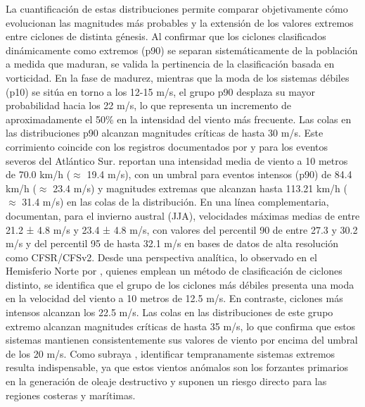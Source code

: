 La cuantificación de estas distribuciones permite comparar objetivamente cómo evolucionan las magnitudes más probables y la extensión de los valores extremos entre ciclones de distinta génesis. Al confirmar que los ciclones clasificados dinámicamente como extremos (p90) se separan sistemáticamente de la población a medida que maduran, se valida la pertinencia de la clasificación basada en vorticidad. En la fase de madurez, mientras que la moda de los sistemas débiles (p10) se sitúa en torno a los 12-15 m/s, el grupo p90 desplaza su mayor probabilidad hacia los 22 m/s, lo que representa un incremento de aproximadamente el 50\% en la intensidad del viento más frecuente. Las colas en las distribuciones p90 alcanzan magnitudes críticas de hasta 30 m/s. Este corrimiento coincide con los registros documentados por \citet{padilhareinke2026characterization} y \citet{gramcianinov2020analysis} para los eventos severos del Atlántico Sur. \citet{padilhareinke2026characterization} reportan una intensidad media de viento a 10 metros de 70.0 km/h ($\approx$ 19.4 m/s), con un umbral para eventos intensos (p90) de 84.4 km/h ($\approx$ 23.4 m/s) y magnitudes extremas que alcanzan hasta 113.21 km/h ($\approx$ 31.4 m/s) en las colas de la distribución. En una línea complementaria, \citet{gramcianinov2020analysis} documentan, para el invierno austral (JJA), velocidades máximas medias de entre 21.2 ± 4.8 m/s y 23.4 ± 4.8 m/s, con valores del percentil 90 de entre 27.3 y 30.2 m/s y del percentil 95 de hasta 32.1 m/s en bases de datos de alta resolución como CFSR/CFSv2. Desde una perspectiva analítica, lo observado en el Hemisferio Norte por \citet{corner2025classification}, quienes emplean un método de clasificación de ciclones distinto, se identifica que el grupo de los ciclones más débiles presenta una moda en la velocidad del viento a 10 metros de 12.5 m/s. En contraste, ciclones más intensos alcanzan los 22.5 m/s. Las colas en las distribuciones de este grupo extremo alcanzan magnitudes críticas de hasta 35 m/s, lo que confirma que estos sistemas mantienen consistentemente sus valores de viento por encima del umbral de los 20 m/s.
%
Como subraya \citet{gramcianinov2023impact}, identificar tempranamente sistemas extremos resulta indispensable, ya que estos vientos anómalos son los forzantes primarios en la generación de oleaje destructivo y suponen un riesgo directo para las regiones costeras y marítimas.

